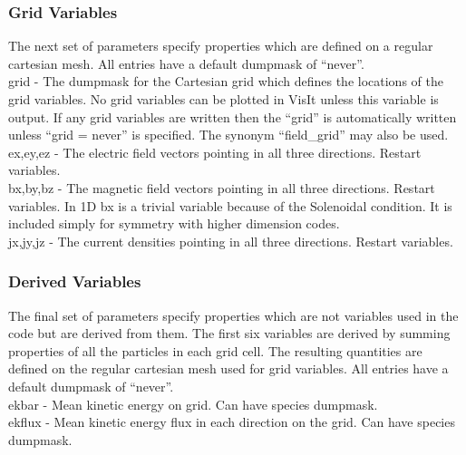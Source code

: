 
\subsubsection{Grid Variables}
The next set of parameters specify properties which are defined on a
regular cartesian mesh. All entries have a default
dumpmask of ``never''.\\

{\emphtext grid} - The dumpmask for the Cartesian grid which defines the
locations of the grid variables. No grid variables can be plotted in VisIt
unless this variable is output.
If any grid variables are written then the
``grid'' is automatically written unless ``grid = never''
is specified.
The synonym ``field\_grid'' may also be used.\\

{\emphtext ex,\;ey,\;ez} - The electric field vectors pointing in all three
directions. Restart variables.\\

{\emphtext bx,\;by,\;bz} - The magnetic field vectors pointing in all three
directions. Restart variables. In 1D bx is a trivial variable because of the
Solenoidal condition. It is included simply for symmetry with higher dimension
codes.\\

{\emphtext jx,\;jy,\;jz} - The current densities pointing in all three
directions. Restart variables.\\

\subsubsection{Derived Variables}
The final set of parameters specify properties which are not variables used
in the code but are derived from them. The first six variables are derived
by summing properties of all the particles in each grid cell. The resulting
quantities are defined on the regular cartesian mesh used for grid variables.
All entries have a default dumpmask of ``never''.\\

{\emphtext ekbar} - Mean kinetic energy on grid. Can have species dumpmask.\\

{\emphtext ekflux} - Mean kinetic energy flux in each direction on the grid.
Can have species dumpmask.\\

